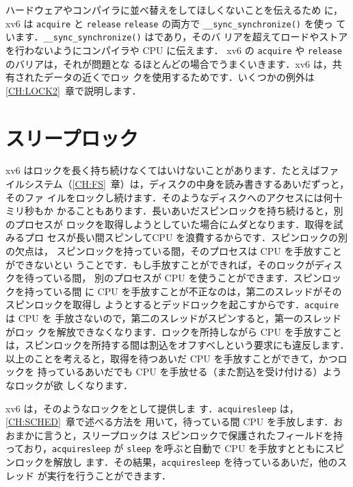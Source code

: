 ハードウェアやコンパイラに並べ替えをしてほしくないことを伝えるため
に，xv6 は
\lstinline{acquire}   と
\lstinline{release} \lstinline{release}  の両方で
\lstinline{__sync_synchronize()} を使っ
ています．\lstinline{__sync_synchronize()} はであり，そのバ
リアを超えてロードやストアを行わないようにコンパイラや CPU に伝えます．
xv6 の \lstinline{acquire} や \lstinline{release} のバリアは，それが問題とな
るほとんどの場合でうまくいきます．xv6 は，共有されたデータの近くでロッ
クを使用するためです．いくつかの例外は \ref{CH:LOCK2}~章で説明します．

\section{スリープロック}


xv6 はロックを長く持ち続けなくてはいけないことがあります．たとえばファ
イルシステム（\ref{CH:FS}~章）は，ディスクの中身を読み書きするあいだずっと，そのファ
イルをロックし続けます．そのようなディスクへのアクセスには何十ミリ秒もか
かることもあります．長いあいだスピンロックを持ち続けると，別のプロセスが
ロックを取得しようとしていた場合にムダとなります．取得を試みるプロ
セスが長い間スピンしてCPU を浪費するからです．スピンロックの別の欠点は，
スピンロックを持っている間，そのプロセスは CPU を手放すことができないとい
うことです．もし手放すことができれば，そのロックがディスクを待っている間，
別のプロセスが CPU を使うことができます．スピンロックを持っている間
に CPU を手放すことが不正なのは，第二のスレッドがそのスピンロックを取得し
ようとするとデッドロックを起こすからです．\texttt{acquire} は CPU を
手放さないので，第二のスレッドがスピンすると，第一のスレッドがロッ
クを解放できなくなります．ロックを所持しながら CPU を手放すこと
は，スピンロックを所持する間は割込をオフすべしという要求にも違反します．
以上のことを考えると，取得を待つあいだ CPU を手放すことができて，かつロックを
持っているあいだでも CPU を手放せる（また割込を受け付ける）ようなロックが欲
しくなります．

xv6 は，そのようなロックをとして提供しま
す．\lstinline{acquiresleep} 
は，\ref{CH:SCHED}~章で述べる方法を
用いて，待っている間 CPU を手放します．おおまかに言うと，スリープロックは
スピンロックで保護されたフィールドを持っており，\lstinline{acquiresleep}
が \lstinline{sleep} を呼ぶと自動で CPU を手放すとともにスピンロックを解放し
ます．その結果，\lstinline{acquiresleep} を待っているあいだ，他のスレッド
が実行を行うことができます．

